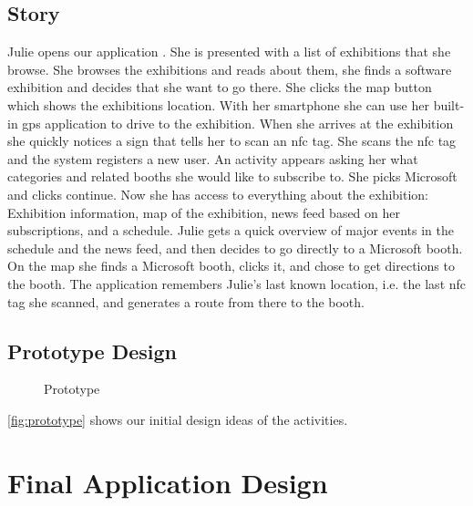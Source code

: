 \subsection*{Story}
Julie opens our application . She is presented with a list of exhibitions that she browse. She browses the exhibitions and reads about them, she finds a software exhibition and decides that she want to go there. She clicks the map button which shows the exhibitions location. With her smartphone she can use her built-in \ac{gps} application to drive to the exhibition. When she arrives at the exhibition she quickly notices a sign that tells her to scan an \acs{nfc} tag. She scans the \acs{nfc} tag and the system registers a new user. An activity appears asking her what categories and related booths she would like to subscribe to. She picks Microsoft and clicks continue. Now she has access to everything about the exhibition: Exhibition information, map of the exhibition, news feed based on her subscriptions, and a schedule. Julie gets a quick overview of major events in the schedule and the news feed, and then decides to go directly to a Microsoft booth. On the map she finds a Microsoft booth, clicks it, and chose to get directions to the booth. The application remembers Julie's last known location, i.e. the last \acs{nfc} tag she scanned, and generates a route from there to the booth.

\subsection*{Prototype Design}

\begin{figure}[H]
\centering
\caption{Prototype}
\label{fig:prototype}
\end{figure}

\autoref{fig:prototype} shows our initial design ideas of the activities. 

\pagebreak
\section{Final Application Design}

